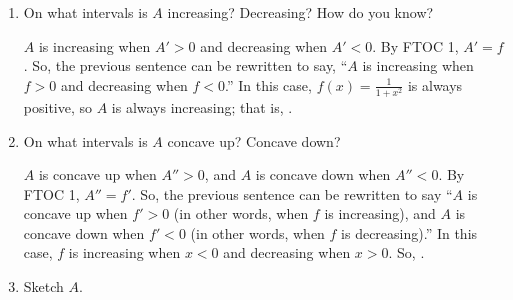 \documentclass[main]{subfiles}
\begin{document}
\begin{enumerate}[resume]
\begin{enumerate}
\begin{enumerate}
  \item


    \begin{problem}[\stretch{0.5}]
      On what intervals is $A$ increasing?  Decreasing?  How do you
      know? 
    \end{problem}

    \begin{solution}
      $A$ is increasing when $A' > 0$ and decreasing when 
      $A' < 0$.  By FTOC 1, $A' = f$.  So, the previous sentence can
      be rewritten to say, ``$A$ is increasing when $f > 0$ and
      decreasing when $f < 0$.''  In this case, $f(x) = \frac{1}{1 + x^2}$
      is always positive, so $A$ is always increasing; that is,
      .
    \end{solution}

  \item


    \begin{problem}[\stretch{0.5}]
      On what intervals is $A$ concave up?  Concave down?
    \end{problem}

    \begin{solution}
      $A$ is concave up when $A'' > 0$, and $A$ is concave
      down when $A'' < 0$.  By FTOC 1, $A'' = f'$.  So, the
      previous sentence can be rewritten to say ``$A$ is concave up
      when $f' > 0$ (in other words, when $f$ is increasing), and $A$
      is concave down when $f' < 0$ (in other words, when $f$ is
      decreasing).''  In this case, $f$ is increasing when $x < 0$ and
      decreasing when $x> 0$.  So, .
    \end{solution}

  \item
    \begin{problem}[\stretch{2}]
      Sketch $A$.
    \end{problem}


\end{enumerate}
\end{enumerate}
\end{enumerate}
\end{document}
